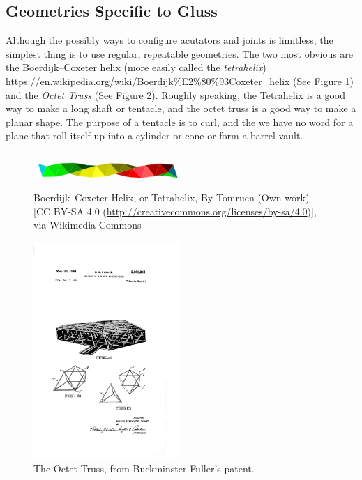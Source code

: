 \documentclass[12pt]{article}
\begin{document}
\subsection{Geometries Specific to Gluss}

Although the possibly ways to configure acutators and joints is limitless, the simplest thing is to
use regular, repeatable geometries. The two most obvious are the Boerdijk–Coxeter helix
(more easily called the \textit{tetrahelix}) \url{https://en.wikipedia.org/wiki/Boerdijk%E2%80%93Coxeter_helix}
  (See Figure \ref{Boedijk-Coxeter-Helix}) and the \emph{Octet Truss} \cite{richard1961synergetic} (See Figure \ref{octet-truss-patent}).
Roughly speaking, the Tetrahelix is a good way to make a long shaft or tentacle, and the octet truss
is a good way to make a planar shape. The purpose of a tentacle is to curl, and the we have no word for
a plane that roll itself up into a cylinder or cone or form a barrel vault.


\begin{figure}[!ht]
  \centering
    \includegraphics[width=0.5\textwidth]{Coxeter_helix_3_colors_cw.png}
    \caption[Boerdijk–Coxeter Helix]{Boerdijk–Coxeter Helix, or Tetrahelix, By Tomruen (Own work)
      [CC BY-SA 4.0 (\url{http://creativecommons.org/licenses/by-sa/4.0})], via Wikimedia Commons}
      \label{Boedijk-Coxeter-Helix}
\end{figure}

\begin{figure}[!ht]
  \centering
    \includegraphics[width=0.5\textwidth]{US2986241-2.png}
    \caption[The Octet Truss]{The Octet Truss, from Buckminster Fuller's patent.}
      \label{octet-truss-patent}
\end{figure}
\end{document}
